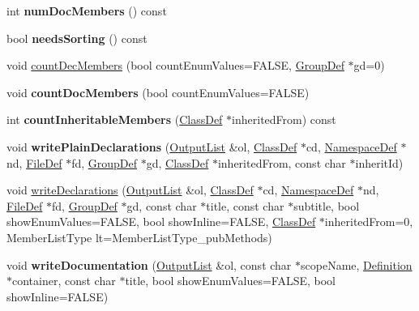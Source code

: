 \begin{DoxyCompactItemize}
int {\bfseries num\+Doc\+Members} () const
\item 
\mbox{\label{class_member_list_a062a8658517d3c208c3400fba38e41f7}} 
bool {\bfseries needs\+Sorting} () const
\item 
void \mbox{\hyperlink{class_member_list_a66706c34a0b45bb65a60db005109f2f5}{count\+Dec\+Members}} (bool count\+Enum\+Values=F\+A\+L\+SE, \mbox{\hyperlink{class_group_def}{Group\+Def}} $\ast$gd=0)
\item 
\mbox{\label{class_member_list_a44030afc5955a218b36b2129aed19402}} 
void {\bfseries count\+Doc\+Members} (bool count\+Enum\+Values=F\+A\+L\+SE)
\item 
\mbox{\label{class_member_list_a63952b4366a8e74fcd812b8e75686cab}} 
int {\bfseries count\+Inheritable\+Members} (\mbox{\hyperlink{class_class_def}{Class\+Def}} $\ast$inherited\+From) const
\item 
\mbox{\label{class_member_list_a6316876a572f8fc044aa7929b6b57eae}} 
void {\bfseries write\+Plain\+Declarations} (\mbox{\hyperlink{class_output_list}{Output\+List}} \&ol, \mbox{\hyperlink{class_class_def}{Class\+Def}} $\ast$cd, \mbox{\hyperlink{class_namespace_def}{Namespace\+Def}} $\ast$nd, \mbox{\hyperlink{class_file_def}{File\+Def}} $\ast$fd, \mbox{\hyperlink{class_group_def}{Group\+Def}} $\ast$gd, \mbox{\hyperlink{class_class_def}{Class\+Def}} $\ast$inherited\+From, const char $\ast$inherit\+Id)
\item 
void \mbox{\hyperlink{class_member_list_ab5c264ca14dfd80e23dbff43cabf1771}{write\+Declarations}} (\mbox{\hyperlink{class_output_list}{Output\+List}} \&ol, \mbox{\hyperlink{class_class_def}{Class\+Def}} $\ast$cd, \mbox{\hyperlink{class_namespace_def}{Namespace\+Def}} $\ast$nd, \mbox{\hyperlink{class_file_def}{File\+Def}} $\ast$fd, \mbox{\hyperlink{class_group_def}{Group\+Def}} $\ast$gd, const char $\ast$title, const char $\ast$subtitle, bool show\+Enum\+Values=F\+A\+L\+SE, bool show\+Inline=F\+A\+L\+SE, \mbox{\hyperlink{class_class_def}{Class\+Def}} $\ast$inherited\+From=0, Member\+List\+Type lt=Member\+List\+Type\+\_\+pub\+Methods)
\item 
\mbox{\label{class_member_list_a9278465bcab183357cfcf1048b80abcf}} 
void {\bfseries write\+Documentation} (\mbox{\hyperlink{class_output_list}{Output\+List}} \&ol, const char $\ast$scope\+Name, \mbox{\hyperlink{class_definition}{Definition}} $\ast$container, const char $\ast$title, bool show\+Enum\+Values=F\+A\+L\+SE, bool show\+Inline=F\+A\+L\+SE)

\end{DoxyCompactItemize}
